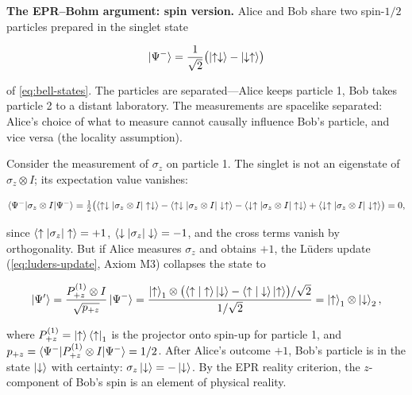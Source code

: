 \medskip\noindent\textbf{The EPR--Bohm argument: spin version.}
Alice and Bob share two spin-$1/2$ particles prepared in the singlet state
\begin{linenomath}
\begin{equation}
\ket{\Psi^-} = \frac{1}{\sqrt{2}}\bigl(\ket{\uparrow\downarrow} - \ket{\downarrow\uparrow}\bigr)
\end{equation}
\end{linenomath}
of \eqref{eq:bell-states}. The particles are separated---Alice keeps particle 1, Bob takes particle 2 to a distant laboratory. The measurements are spacelike separated: Alice's choice of what to measure cannot causally influence Bob's particle, and vice versa (the locality assumption).

Consider the measurement of $\sigma_z$ on particle 1. The singlet is not an eigenstate of $\sigma_z \otimes I$; its expectation value vanishes:
\begin{linenomath}
\begin{equation}
\braket{\Psi^-|\sigma_z \otimes I|\Psi^-}
= \tfrac12\bigl(\braket{\uparrow\downarrow|\sigma_z\otimes I|\uparrow\downarrow}
- \braket{\uparrow\downarrow|\sigma_z\otimes I|\downarrow\uparrow}
- \braket{\downarrow\uparrow|\sigma_z\otimes I|\uparrow\downarrow}
+ \braket{\downarrow\uparrow|\sigma_z\otimes I|\downarrow\uparrow}\bigr) = 0,
\label{eq:epr-singlet-correlation}
\end{equation}
\end{linenomath}
since $\braket{\uparrow|\sigma_z|\uparrow} = +1$, $\braket{\downarrow|\sigma_z|\downarrow} = -1$, and the cross terms vanish by orthogonality. But if Alice measures $\sigma_z$ and obtains $+1$, the L\"uders update (\eqref{eq:luders-update}, Axiom M3) collapses the state to
\begin{linenomath}
\begin{equation}
\ket{\Psi'} = \frac{P_{+z}^{(1)} \otimes I}{\sqrt{p_{+z}}} \ket{\Psi^-}
= \frac{\ket{\uparrow}_1 \otimes \bigl(\braket{\uparrow|\uparrow}\ket{\downarrow} - \braket{\uparrow|\downarrow}\ket{\uparrow}\bigr)/\sqrt{2}}{1/\sqrt{2}}
= \ket{\uparrow}_1 \otimes \ket{\downarrow}_2,
\end{equation}
\end{linenomath}
where $P_{+z}^{(1)} = \ket{\uparrow}\bra{\uparrow}_1$ is the projector onto spin-up for particle 1, and $p_{+z} = \braket{\Psi^-|P_{+z}^{(1)} \otimes I|\Psi^-} = 1/2$. After Alice's outcome $+1$, Bob's particle is in the state $\ket{\downarrow}$ with certainty: $\sigma_z\ket{\downarrow} = -\ket{\downarrow}$. By the EPR reality criterion, the $z$-component of Bob's spin is an element of physical reality.

